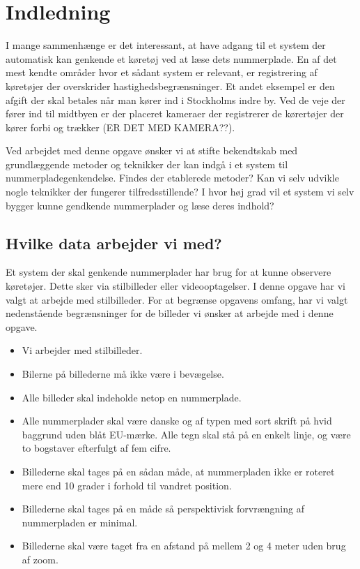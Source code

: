 \section{Indledning}




I mange sammenhænge er det interessant, at have adgang til et system der automatisk kan genkende et køretøj ved at læse dets nummerplade. En af det mest kendte områder hvor et sådant system er relevant, er registrering af køretøjer der overskrider hastighedsbegrænsninger. Et andet eksempel er den afgift der skal betales når man kører ind i Stockholms indre by. Ved de veje der fører ind til midtbyen er der placeret kameraer der registrerer de kørertøjer der kører forbi og trækker (ER DET MED KAMERA??).

Ved arbejdet med denne opgave ønsker vi at stifte bekendtskab med grundlæggende metoder og teknikker der kan indgå i et system til nummerpladegenkendelse. Findes der etablerede metoder? Kan vi selv udvikle nogle teknikker der fungerer tilfredsstillende? I hvor høj grad vil et system vi selv bygger kunne gendkende nummerplader og læse deres indhold? 

\subsection{Hvilke data arbejder vi med?}
Et system der skal genkende nummerplader har brug for at kunne observere køretøjer. Dette sker via stilbilleder eller videooptagelser. I denne opgave har vi valgt at arbejde med stilbilleder. For at begrænse opgavens omfang, har vi valgt nedenstående begrænsninger for de billeder vi ønsker at arbejde med i denne opgave. 

\begin{itemize}
\item Vi arbejder med stilbilleder.
\item Bilerne på billederne må ikke være i bevægelse.
\item Alle billeder skal indeholde netop en nummerplade.
\item Alle nummerplader skal være danske og af typen med sort skrift på hvid baggrund uden blåt EU-mærke. Alle tegn skal stå på en enkelt linje, og være to bogstaver efterfulgt af fem cifre.
\item Billederne skal tages på en sådan måde, at nummerpladen ikke er roteret mere end 10 grader i forhold til vandret position.
\item Billederne skal tages på en måde så perspektivisk forvrængning af nummerpladen er minimal.
\item Billederne skal være taget fra en afstand på mellem 2 og 4 meter  uden brug af zoom.
\end{itemize}

